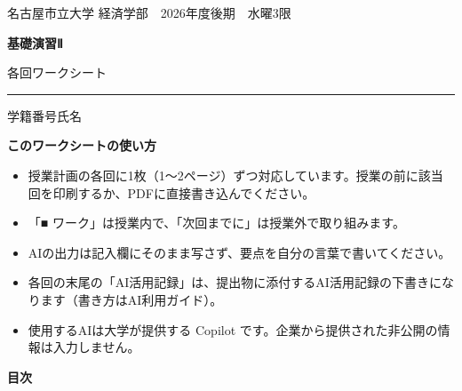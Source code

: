 \thispagestyle{cover}
\vspace*{18mm}
{\sffamily\color{pone}\large 名古屋市立大学 経済学部　2026年度後期　水曜3限}\par
\vspace{3mm}
{\sffamily\bfseries\fontsize{30pt}{38pt}\selectfont 基礎演習Ⅱ}\par
\vspace{2mm}
{\sffamily\fontsize{20pt}{26pt}\selectfont 各回ワークシート}\par
\vspace{4mm}
{\color{inktwo}\rule{\linewidth}{0.6pt}}\par
\vspace{4mm}
{\sffamily\small 学籍番号\makebox[40mm]{\hrulefill}\qquad 氏名\makebox[60mm]{\hrulefill}}\par
\vspace{10mm}

\begin{tcolorbox}[enhanced,colback=papertwo,colframe=papertwo,boxrule=0pt,arc=1.5mm,
    left=4mm,right=4mm,top=3mm,bottom=3mm,fontupper=\small]
{\sffamily\bfseries このワークシートの使い方}\par\vspace{1mm}
\begin{itemize}[label=・]
  \item 授業計画の各回に1枚（1〜2ページ）ずつ対応しています。授業の前に該当回を印刷するか、PDFに直接書き込んでください。
  \item 「■ ワーク」は授業内で、「次回までに」は授業外で取り組みます。
  \item AIの出力は記入欄にそのまま写さず、要点を自分の言葉で書いてください。
  \item 各回の末尾の「AI活用記録」は、提出物に添付するAI活用記録の下書きになります（書き方はAI利用ガイド）。
  \item 使用するAIは大学が提供する Copilot です。企業から提供された非公開の情報は入力しません。
\end{itemize}
\end{tcolorbox}

\vspace{6mm}
{\sffamily\bfseries 目次}\par\vspace{1mm}
{\small\makeatletter{}\makeatother}
